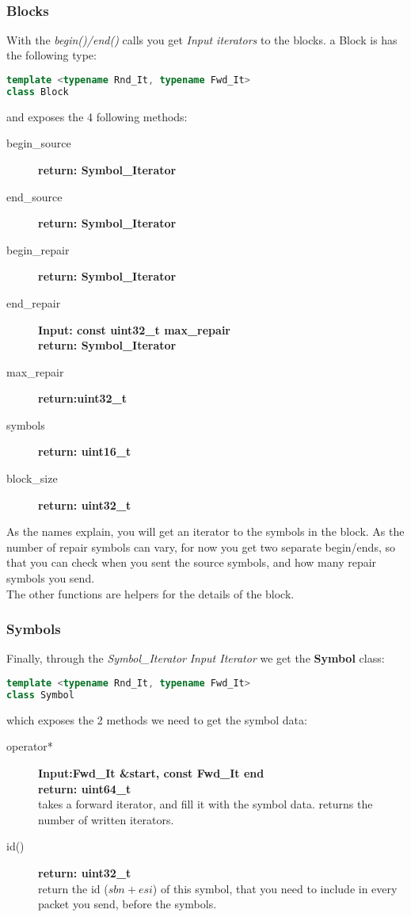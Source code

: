 \documentclass[11pt,a4paper]{refart}
\begin{document}
~\\

\subsubsection{Blocks}
With the \textit{begin()/end()} calls you get \textit{Input iterators} to the blocks. a Block is has the following type:
\begin{lstlisting}[language=C++]
template <typename Rnd_It, typename Fwd_It>
class Block
\end{lstlisting}

and exposes the 4 following methods:
\begin{description}
\item[begin\_source]\textbf{return: Symbol\_Iterator}
\item[end\_source]\textbf{return: Symbol\_Iterator}
\item[begin\_repair]\textbf{return: Symbol\_Iterator}
\item[end\_repair]\textbf{Input: const uint32\_t max\_repair}\\
\textbf{return: Symbol\_Iterator}
\item[max\_repair]\textbf{return:uint32\_t}
\item[symbols]\textbf{return: uint16\_t}
\item[block\_size]\textbf{return: uint32\_t}
\end{description}

As the names explain, you will get an iterator to the symbols in the block. As the number of repair symbols can vary, for now you get two separate begin/ends,
so that you can check when you sent the source symbols, and how many repair symbols you send.\\
The other functions are helpers for the details of the block.


\subsubsection{Symbols}
Finally, through the \textit{Symbol\_Iterator} \textit{Input Iterator} we get the \textbf{Symbol} class:
\begin{lstlisting}[language=C++]
template <typename Rnd_It, typename Fwd_It>
class Symbol
\end{lstlisting}

which exposes the 2 methods we need to get the symbol data:

\begin{description}
\item[operator*]\textbf{Input:Fwd\_It \&start, const Fwd\_It end}\\
\textbf{return: uint64\_t}\\
takes a forward iterator, and fill it with the symbol data. returns the number of written iterators.
\item[id()]\textbf{return: uint32\_t}\\
return the id (\textit{$sbn + esi$}) of this symbol, that you need to include in every packet you send, before the symbols.
\end{description}
\end{document}
